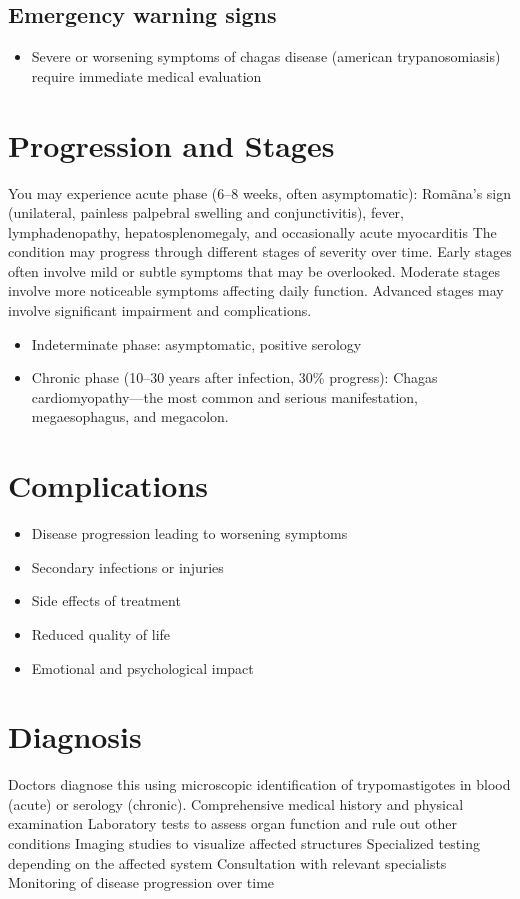 \subsection{Emergency warning signs}
\begin{itemize}[noitemsep]
  \item Severe or worsening symptoms of chagas disease (american trypanosomiasis) require immediate medical evaluation
\end{itemize}
\section{Progression and Stages}
You may experience acute phase (6--8 weeks, often asymptomatic): Romãna's sign (unilateral, painless palpebral swelling and conjunctivitis), fever, lymphadenopathy, hepatosplenomegaly, and occasionally acute myocarditis The condition may progress through different stages of severity over time. Early stages often involve mild or subtle symptoms that may be overlooked. Moderate stages involve more noticeable symptoms affecting daily function. Advanced stages may involve significant impairment and complications.

\begin{itemize}[noitemsep]
  \item Indeterminate phase: asymptomatic, positive serology
  \item Chronic phase (10--30 years after infection, 30\% progress): Chagas cardiomyopathy---the most common and serious manifestation, megaesophagus, and megacolon.
\end{itemize}
\section{Complications}
\begin{itemize}[noitemsep]
  \item Disease progression leading to worsening symptoms
  \item Secondary infections or injuries
  \item Side effects of treatment
  \item Reduced quality of life
  \item Emotional and psychological impact
\end{itemize}
\section{Diagnosis}
Doctors diagnose this using microscopic identification of trypomastigotes in blood (acute) or serology (chronic). Comprehensive medical history and physical examination Laboratory tests to assess organ function and rule out other conditions Imaging studies to visualize affected structures Specialized testing depending on the affected system Consultation with relevant specialists Monitoring of disease progression over time

